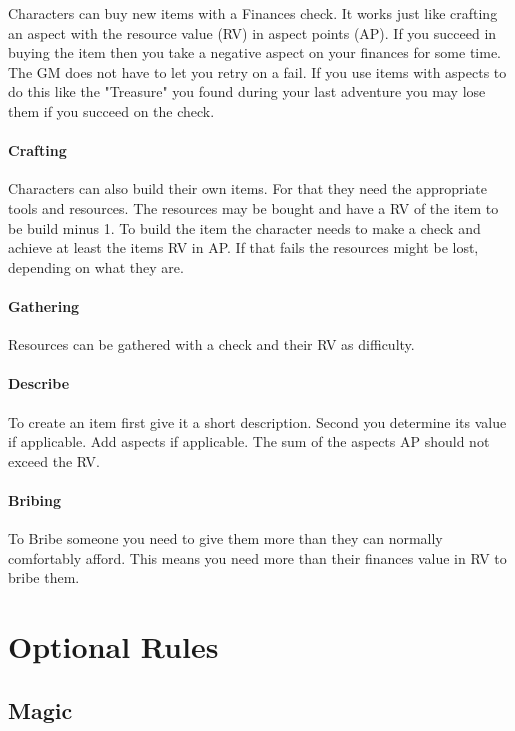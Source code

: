 \documentclass[11pt]{article}
\begin{document}
{Characters can buy new items with a Finances check. It works just like crafting an aspect with the resource value (RV) in aspect points (AP). If you succeed in buying the item then you take a negative aspect on your finances for some time. The GM does not have to let you retry on a fail. If you use items with aspects to do this like the "Treasure" you found during your last adventure you may lose them if you succeed on the check.

\paragraph*{Crafting}
\label{sec:orgafa70cf}
Characters can also build their own items. For that they need the appropriate tools and resources. The resources may be bought and have a RV of the item to be build minus 1. To build the item the character needs to make a check and achieve at least the items RV in AP. If that fails the resources might be lost, depending on what they are.

\paragraph*{Gathering}
\label{sec:orga475885}
Resources can be gathered with a check and their RV as difficulty.

\paragraph*{Describe}
\label{sec:org57ebf56}
To create an item first give it a short description. Second you determine its value if applicable. Add aspects if applicable. The sum of the aspects AP should not exceed the RV.

\paragraph*{Bribing}
\label{sec:orgbc0e31b}
To Bribe someone you need to give them more than they can normally comfortably afford. This means you need more than their finances value in RV to bribe them.

\section{Optional Rules}
\label{sec:org658e8d0}
\subsection{Magic}
\label{sec:orgeade8a5}

}
\end{document}

